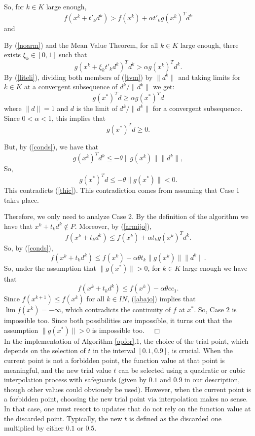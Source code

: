 \documentclass{article}
\newcommand{\N}         {I\!\!N}
\newcommand{\halmos}    {\hfill $\;\;\;\Box$\\}
\begin{document}
 So, for $k \in K$ large enough,  
 \begin{equation} \label{noarm}
f(x^k + t'_k d^k) > f(x^k) + \alpha t'_k  g(x^k)^T d^k
\end{equation}  
and

 By (\ref{noarm}) and the Mean Value Theorem, for all $k \in K$ large enough, there exists $\xi_k \in [0, 1]$
  such that
\begin{equation} \label{tvm}
 g(x^k + \xi_k t'_k d^k)^T d^k > \alpha g(x^k)^T d^k.
\end{equation}
By (\ref{liteli}), dividing both members
 of (\ref{tvm}) by $\|d^k\|$ and taking limits for $k \in K$ at a convergent subsequence of $d^k / \|d^k\|$ we get:
\begin{equation} \label{thico}
g(x^*)^T d \geq \alpha g(x^*)^T d
\end{equation}
where $\|d\|=1$ and $d$ is the limit of $d^k/\|d^k\|$ for a convergent subsequence. Since $0 < \alpha < 1$, this implies that
\begin{equation} \label{thic}
g(x^*)^T d \geq 0.
\end{equation}

  But, by (\ref{conds}), we have that 
\[
g(x^k)^T d^k \leq - \theta \|g(x^k)\| \|d^k\|,
\]
So, 
\[
g(x^*)^T d \leq - \theta  \|g(x^*)\| < 0.
\]
 This contradicts (\ref{thic}). This contradiction comes from assuming that Case 1 takes place.

Therefore, we only need to analyze Case 2. By the definition of the algorithm we have that $x^k + t_k d^k \notin P$.
  Moreover, by (\ref{armijo}),
\[
f(x^k + t_k d^k) \leq f(x^k) + \alpha t_k g(x^k)^T d^k.
\]
So, by (\ref{conds}), 
 \[
f(x^k + t_k d^k) \leq f(x^k) -  \alpha  \theta t_k \|g(x^k)\| \|d^k\|. 
\]   
 So, under the assumption that $\|g(x^*)\| > 0$, for $k \in K$ large enough we have that
\begin{equation} \label{abajo}
f(x^k + t_k d^k) \leq f(x^k) - \alpha \theta c c_1.
\end{equation}
Since $f(x^{k+1}) \leq f(x^k)$ for all $k \in \N$, (\ref{abajo}) implies that $\lim f(x^k) = -\infty$, which contradicts the
 continuity of $f$ at $x^*$. So, Case 2 is impossible too. Since both possibilities are impossible, it turns out that
  the assumption $\|g(x^*)\| > 0$ is impossible too. \halmos


In the implementation of Algorithm \ref{opfor}.1, the choice of the trial point, which depends on the selection of $t$
 in the interval $[0.1,0.9]$, is crucial. When the current point is not a forbidden point, the function value at that point is meaningful,
 and the new trial value $t$ can be selected using a quadratic or cubic interpolation process with safeguards
 (given by $0.1$ and $0.9$ in our description, though other values could obviously be used). However, when the current point 
is a forbidden point, choosing the new trial point via interpolation makes no sense. In that case, one must resort to updates 
that do not rely on the function value at the discarded point. Typically, the new $t$ is defined as the discarded one multiplied
 by either $0.1$ or $0.5$. 
\end{document}
